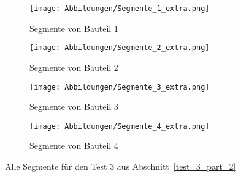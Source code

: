 \begin{figure}[h]
	\centering
	\begin{subfigure}{0.49\textwidth}
		\texttt{[image: Abbildungen/Segmente\_1\_extra.png]}
		\centering
		\caption{Segmente von Bauteil 1}
		\label{fig:Segmente_1}
	\end{subfigure}
	\hfill
	\begin{subfigure}{0.49\textwidth}
		\texttt{[image: Abbildungen/Segmente\_2\_extra.png]}
		\centering
		\caption{Segmente von Bauteil 2}
		\label{fig:Segmente_2}
	\end{subfigure}
	\vfill
	\begin{subfigure}{0.49\textwidth}
		\texttt{[image: Abbildungen/Segmente\_3\_extra.png]}
		\centering
		\caption{Segmente von Bauteil 3}
		\label{fig:Segmente_3}
	\end{subfigure}
	\hfill
	\begin{subfigure}{0.49\textwidth}
		\texttt{[image: Abbildungen/Segmente\_4\_extra.png]}
		\centering
		\caption{Segmente von Bauteil 4}
		\label{fig:Segmente_4}
	\end{subfigure}
	\caption{Alle Segmente für den Test 3 aus Abschnitt~\ref{test_3_part_2}}
	\label{fig:Segmente_test_3_2}
\end{figure}
